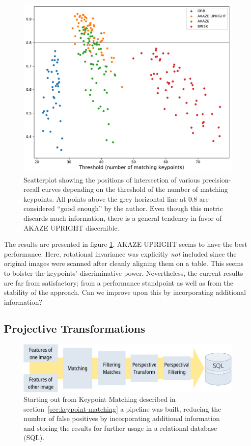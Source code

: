 \documentclass{ltjarticle}
\begin{document}
\begin{figure}
    \centering
    \includegraphics[width=\textwidth]{keypoint-evaluation.pdf}
    \caption[Scatterplot of keypoint performance]{Scatterplot showing the positions of intersection of various precision-recall curves depending on the threshold of the number of matching keypoints. All points above the grey horizontal line at $0.8$ are considered “good enough” by the author. Even though this metric discards much information, there is a general tendency in favor of AKAZE UPRIGHT discernible.}
    \label{fig:keypoint-evaluation}
\end{figure}

The results are presented in figure \ref{fig:keypoint-evaluation}. AKAZE UPRIGHT seems to have the best performance. Here, rotational invariance was explicitly \emph{not} included since the original images were scanned after cleanly aligning them on a table. This seems to bolster the keypoints' discriminative power. Nevertheless, the current results are far from satisfactory; from a performance standpoint as well as from the stability of the approach. Can we improve upon this by incorporating additional information?

\subsection{Projective Transformations}

\begin{figure}
    \centering
    \includegraphics[width=\textwidth]{pipeline.pdf}
    \caption[Full processing pipeline]{Starting out from Keypoint Matching described in section~\ref{sec:keypoint-matching} a pipeline was built, reducing the number of false positives by incorporating additional information and storing the results for further usage in a relational database (SQL).}
    \label{fig:pipeline}
\end{figure}
\end{document}
